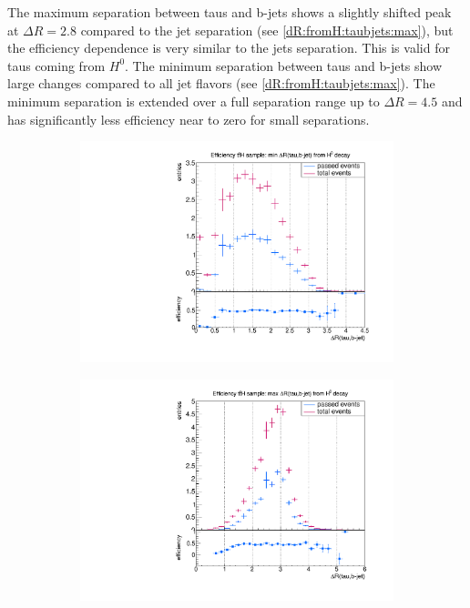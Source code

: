 %
The maximum separation between taus and b-jets shows a slightly shifted peak at $\Delta R=2.8$ compared to the jet separation (see \ref{dR:fromH:taubjets:max}), but the efficiency dependence is very similar to the jets separation. This is valid for taus coming from $H^0$.  The minimum separation between taus and b-jets show large changes compared to all jet flavors (see \ref{dR:fromH:taubjets:max}). The minimum separation is extended over a full separation range up to $\Delta R=4.5$ and has significantly less efficiency near to zero for small separations.
%
\begin{figure}
  \centering
                \begin{subfigure}[t]{0.49\textwidth}
                \includegraphics[width=\textwidth]{figures/plots/ttH/Divided_mindR_fromH_taubjet.pdf}
                \label{dR:fromH:taubjets:min}
                \end{subfigure}
                \begin{subfigure}[t]{0.49\textwidth}
                \includegraphics[width=\textwidth]{figures/plots/ttH/Divided_maxdR_fromH_taubjet.pdf}

\end{subfigure}
\end{figure}

